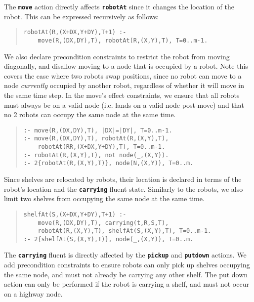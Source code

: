\documentclass[letterpaper]{article}
\newcommand{\ct}[1]{\texttt{\textbf{#1}}}
\begin{document}
The  \ct{move}  action directly affects \ct{robotAt} since it changes the location of the robot. This can be expressed recursively as follows:
\begin{quote}\begin{scriptsize}\begin{verbatim}
robotAt(R,(X+DX,Y+DY),T+1) :-
    move(R,(DX,DY),T), robotAt(R,(X,Y),T), T=0..m-1.
\end{verbatim}\end{scriptsize}\end{quote}

We also declare precondition constraints to restrict the robot from moving diagonally, and disallow moving to a node that is occupied by a robot. Note this covers the case where two robots swap positions, since no robot can move to a node \emph{currently} occupied by another robot, regardless of whether it will move in the same time step.
In the move's effect constraints, we ensure that all robots must always be on a valid node (i.e. lands on a valid node post-move) and that no 2 robots can occupy the same node at the same time.

\begin{quote}\begin{scriptsize}\begin{verbatim}
:- move(R,(DX,DY),T), |DX|=|DY|, T=0..m-1.
:- move(R,(DX,DY),T), robotAt(R,(X,Y),T),
    robotAt(RR,(X+DX,Y+DY),T), T=0..m-1.
:- robotAt(R,(X,Y),T), not node(_,(X,Y)).
:- 2{robotAt(R,(X,Y),T)}, node(N,(X,Y)), T=0..m.
\end{verbatim}\end{scriptsize}\end{quote}

Since shelves are relocated by robots, their location is declared in terms of the robot's location and the \ct{carrying}  fluent state. Similarly to the robots, we also limit two shelves from occupying the same node at the same time.

\begin{quote}\begin{scriptsize}\begin{verbatim}
shelfAt(S,(X+DX,Y+DY),T+1) :-
    move(R,(DX,DY),T), carrying(t,R,S,T),
    robotAt(R,(X,Y),T), shelfAt(S,(X,Y),T), T=0..m-1.
:- 2{shelfAt(S,(X,Y),T)}, node(_,(X,Y)), T=0..m.
\end{verbatim}\end{scriptsize}\end{quote}

The \ct{carrying} fluent is directly affected by the \ct{pickup} and \ct{putdown} actions. We add precondition constraints to ensure robots can only pick up shelves occupying the same node, and must not already be carrying any other shelf. The put down action can only be performed if the robot is carrying a shelf, and must not occur on a highway node.
\end{document}
